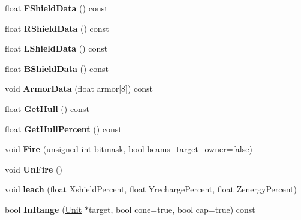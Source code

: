 \begin{DoxyCompactItemize}
\item 
float {\bfseries F\+Shield\+Data} () const \hypertarget{classUnit_a149b10e23ede55524841c1a5c52c6c66}{}\label{classUnit_a149b10e23ede55524841c1a5c52c6c66}

\item 
float {\bfseries R\+Shield\+Data} () const \hypertarget{classUnit_a9e7a65ed1d0f9782d8b34187c069f03f}{}\label{classUnit_a9e7a65ed1d0f9782d8b34187c069f03f}

\item 
float {\bfseries L\+Shield\+Data} () const \hypertarget{classUnit_a9f47aa9362c871ca1029f40c29059884}{}\label{classUnit_a9f47aa9362c871ca1029f40c29059884}

\item 
float {\bfseries B\+Shield\+Data} () const \hypertarget{classUnit_addc8945c00a3d338e5367a20dc7a7e84}{}\label{classUnit_addc8945c00a3d338e5367a20dc7a7e84}

\item 
void {\bfseries Armor\+Data} (float armor\mbox{[}8\mbox{]}) const \hypertarget{classUnit_ac9a1d874d006e5e140c1f493430ea392}{}\label{classUnit_ac9a1d874d006e5e140c1f493430ea392}

\item 
float {\bfseries Get\+Hull} () const \hypertarget{classUnit_ae45ca0e974803a070734e99881f860e1}{}\label{classUnit_ae45ca0e974803a070734e99881f860e1}

\item 
float {\bfseries Get\+Hull\+Percent} () const \hypertarget{classUnit_ae3cb8c09fd683139013daf308d167c29}{}\label{classUnit_ae3cb8c09fd683139013daf308d167c29}

\item 
void {\bfseries Fire} (unsigned int bitmask, bool beams\+\_\+target\+\_\+owner=false)\hypertarget{classUnit_ae803e2ec14a1da69584d1b25ccbf41bf}{}\label{classUnit_ae803e2ec14a1da69584d1b25ccbf41bf}

\item 
void {\bfseries Un\+Fire} ()\hypertarget{classUnit_a4f9922c15cad4ceaed349d7f78386691}{}\label{classUnit_a4f9922c15cad4ceaed349d7f78386691}

\item 
void {\bfseries leach} (float Xshield\+Percent, float Yrecharge\+Percent, float Zenergy\+Percent)\hypertarget{classUnit_a9d5d1ec2d82c09b436c6071b81899a7d}{}\label{classUnit_a9d5d1ec2d82c09b436c6071b81899a7d}

\item 
bool {\bfseries In\+Range} (\hyperlink{classUnit}{Unit} $\ast$target, bool cone=true, bool cap=true) const \hypertarget{classUnit_ae1575e0418e2efafb82b52a40054b039}{}\label{classUnit_ae1575e0418e2efafb82b52a40054b039}


\end{DoxyCompactItemize}
